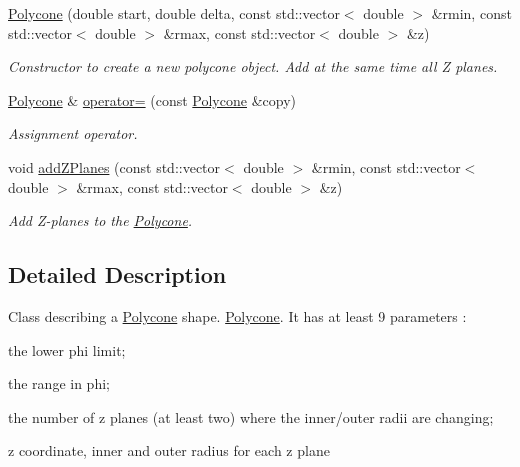 \begin{DoxyCompactItemize}
\hyperlink{class_d_d4hep_1_1_geometry_1_1_polycone_a111234e6083a005c756d58526852d67c}{Polycone} (double start, double delta, const std::vector$<$ double $>$ \&rmin, const std::vector$<$ double $>$ \&rmax, const std::vector$<$ double $>$ \&z)
\begin{DoxyCompactList}\small\item\em Constructor to create a new polycone object. Add at the same time all Z planes. \item\end{DoxyCompactList}\item 
\hyperlink{class_d_d4hep_1_1_geometry_1_1_polycone}{Polycone} \& \hyperlink{class_d_d4hep_1_1_geometry_1_1_polycone_af835c690e14207f479b096d84167bad2}{operator=} (const \hyperlink{class_d_d4hep_1_1_geometry_1_1_polycone}{Polycone} \&copy)
\begin{DoxyCompactList}\small\item\em Assignment operator. \item\end{DoxyCompactList}\item 
void \hyperlink{class_d_d4hep_1_1_geometry_1_1_polycone_abd0c99bd0c46a720fd11096b5b4a1eb1}{addZPlanes} (const std::vector$<$ double $>$ \&rmin, const std::vector$<$ double $>$ \&rmax, const std::vector$<$ double $>$ \&z)
\begin{DoxyCompactList}\small\item\em Add Z-\/planes to the \hyperlink{class_d_d4hep_1_1_geometry_1_1_polycone}{Polycone}. \item\end{DoxyCompactList}\end{DoxyCompactItemize}


\subsection{Detailed Description}
Class describing a \hyperlink{class_d_d4hep_1_1_geometry_1_1_polycone}{Polycone} shape. \hyperlink{class_d_d4hep_1_1_geometry_1_1_polycone}{Polycone}. It has at least 9 parameters :
\begin{DoxyItemize}
\item the lower phi limit;
\item the range in phi;
\item the number of z planes (at least two) where the inner/outer radii are changing;
\item z coordinate, inner and outer radius for each z plane
\end{DoxyItemize}


